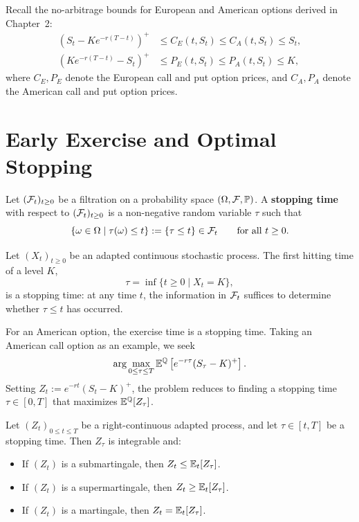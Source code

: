 Recall the no-arbitrage bounds for European and American options derived in Chapter~2:
\[
\begin{aligned}
    \left(S_t - K e^{-r(T-t)}\right)^+ &\le C_E(t, S_t) \le C_A(t, S_t) \le S_t, \\
    \left(K e^{-r(T-t)} - S_t\right)^+ &\le P_E(t, S_t) \le P_A(t, S_t) \le K,
\end{aligned}
\]
where $C_E, P_E$ denote the European call and put option prices, and $C_A, P_A$ denote the American call and put option prices.

\section{Early Exercise and Optimal Stopping}

\begin{definition}\label{def:stopping-time}
    Let $(\mathcal{F}_t)_{t \ge 0}$ be a filtration on a probability space $(\Omega, \mathcal{F}, \mathbb{P})$. A \textbf{stopping time} with respect to $(\mathcal{F}_t)_{t \ge 0}$ is a non-negative random variable $\tau$ such that
    \[
    \{\omega \in \Omega \mid \tau(\omega) \le t\} := \{\tau \le t\} \in \mathcal{F}_t \qquad \text{for all } t \ge 0.
    \]
\end{definition}

\begin{example}
    Let $(X_t)_{t \ge 0}$ be an adapted continuous stochastic process. The first hitting time of a level $K$,
    \[
    \tau = \inf\{t \ge 0 \mid X_t = K\},
    \]
    is a stopping time: at any time $t$, the information in $\mathcal{F}_t$ suffices to determine whether $\tau \le t$ has occurred.
\end{example}

For an American option, the exercise time is a stopping time. Taking an American call option as an example, we seek
\[
\arg\max_{0 \le \tau \le T} \mathbb{E}^{\mathbb{Q}}\left[e^{-r\tau}(S_\tau - K)^+\right].
\]
Setting $Z_t := e^{-rt}(S_t - K)^+$, the problem reduces to finding a stopping time $\tau \in [0, T]$ that maximizes $\mathbb{E}^{\mathbb{Q}}[Z_\tau]$.

\begin{lemma}\label{lem:optional-sampling}
    Let $(Z_t)_{0 \le t \le T}$ be a right-continuous adapted process, and let $\tau \in [t, T]$ be a stopping time. Then $Z_\tau$ is integrable and:
    \begin{itemize}
        \item If $(Z_t)$ is a submartingale, then $Z_t \le \mathbb{E}_t[Z_\tau]$.
        \item If $(Z_t)$ is a supermartingale, then $Z_t \ge \mathbb{E}_t[Z_\tau]$.
        \item If $(Z_t)$ is a martingale, then $Z_t = \mathbb{E}_t[Z_\tau]$.
    \end{itemize}
\end{lemma}

